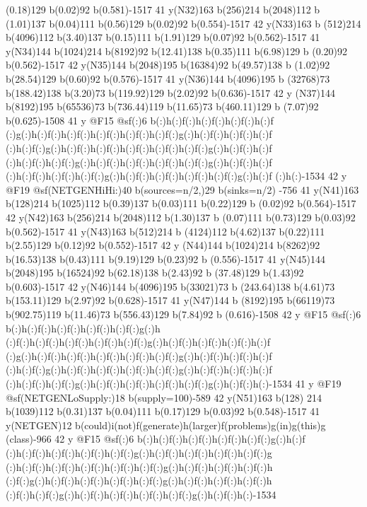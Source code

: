 {{{{{{{{{{{{{{{{{{{{{{{{{{{{{{{{{(0.18)129 b(0.02)92 b(0.581)-1517 41 y(N32)163 b(256)214 b(2048)112 b
(1.01)137 b(0.04)111 b(0.56)129 b(0.02)92 b(0.554)-1517 42 y(N33)163 b
(512)214 b(4096)112 b(3.40)137 b(0.15)111 b(1.91)129 b(0.07)92 b(0.562)-1517 
41 y(N34)144 b(1024)214 b(8192)92 b(12.41)138 b(0.35)111 b(6.98)129 b
(0.20)92 b(0.562)-1517 42 y(N35)144 b(2048)195 b(16384)92 b(49.57)138 b
(1.02)92 b(28.54)129 b(0.60)92 b(0.576)-1517 41 y(N36)144 b(4096)195 b
(32768)73 b(188.42)138 b(3.20)73 b(119.92)129 b(2.02)92 b(0.636)-1517 42 y
(N37)144 b(8192)195 b(65536)73 b(736.44)119 b(11.65)73 b(460.11)129 b
(7.07)92 b(0.625)-1508 41 y @F15 @sf(:)6 b(:)h(:)f(:)h(:)f(:)h(:)f(:)h(:)f
(:)g(:)h(:)f(:)h(:)f(:)h(:)f(:)h(:)f(:)h(:)f(:)g(:)h(:)f(:)h(:)f(:)h(:)f
(:)h(:)f(:)g(:)h(:)f(:)h(:)f(:)h(:)f(:)h(:)f(:)h(:)f(:)g(:)h(:)f(:)h(:)f
(:)h(:)f(:)h(:)f(:)g(:)h(:)f(:)h(:)f(:)h(:)f(:)h(:)f(:)g(:)h(:)f(:)h(:)f
(:)h(:)f(:)h(:)f(:)h(:)f(:)g(:)h(:)f(:)h(:)f(:)h(:)f(:)h(:)f(:)g(:)h(:)f
(:)h(:)-1534 42 y @F19 @sf(NETGEN{Hi{Hi:)40 b(sources=n/2,)29 b(sinks=n/2)
-756 41 y(N41)163 b(128)214 b(1025)112 b(0.39)137 b(0.03)111 b(0.22)129 b
(0.02)92 b(0.564)-1517 42 y(N42)163 b(256)214 b(2048)112 b(1.30)137 b
(0.07)111 b(0.73)129 b(0.03)92 b(0.562)-1517 41 y(N43)163 b(512)214 b
(4124)112 b(4.62)137 b(0.22)111 b(2.55)129 b(0.12)92 b(0.552)-1517 42 y
(N44)144 b(1024)214 b(8262)92 b(16.53)138 b(0.43)111 b(9.19)129 b(0.23)92 b
(0.556)-1517 41 y(N45)144 b(2048)195 b(16524)92 b(62.18)138 b(2.43)92 b
(37.48)129 b(1.43)92 b(0.603)-1517 42 y(N46)144 b(4096)195 b(33021)73 b
(243.64)138 b(4.61)73 b(153.11)129 b(2.97)92 b(0.628)-1517 41 y(N47)144 b
(8192)195 b(66119)73 b(902.75)119 b(11.46)73 b(556.43)129 b(7.84)92 b
(0.616)-1508 42 y @F15 @sf(:)6 b(:)h(:)f(:)h(:)f(:)h(:)f(:)h(:)f(:)g(:)h
(:)f(:)h(:)f(:)h(:)f(:)h(:)f(:)h(:)f(:)g(:)h(:)f(:)h(:)f(:)h(:)f(:)h(:)f
(:)g(:)h(:)f(:)h(:)f(:)h(:)f(:)h(:)f(:)h(:)f(:)g(:)h(:)f(:)h(:)f(:)h(:)f
(:)h(:)f(:)g(:)h(:)f(:)h(:)f(:)h(:)f(:)h(:)f(:)g(:)h(:)f(:)h(:)f(:)h(:)f
(:)h(:)f(:)h(:)f(:)g(:)h(:)f(:)h(:)f(:)h(:)f(:)h(:)f(:)g(:)h(:)f(:)h(:)-1534 
41 y @F19 @sf(NETGEN{Lo{Supply:)18 b(supply=100)-589 42 y(N51)163 b(128)
214 b(1039)112 b(0.31)137 b(0.04)111 b(0.17)129 b(0.03)92 b(0.548)-1517 
41 y(NETGEN)12 b(could)i(not)f(generate)h(larger)f(problems)g(in)g(this)g
(class)-966 42 y @F15 @sf(:)6 b(:)h(:)f(:)h(:)f(:)h(:)f(:)h(:)f(:)g(:)h(:)f
(:)h(:)f(:)h(:)f(:)h(:)f(:)h(:)f(:)g(:)h(:)f(:)h(:)f(:)h(:)f(:)h(:)f(:)g
(:)h(:)f(:)h(:)f(:)h(:)f(:)h(:)f(:)h(:)f(:)g(:)h(:)f(:)h(:)f(:)h(:)f(:)h
(:)f(:)g(:)h(:)f(:)h(:)f(:)h(:)f(:)h(:)f(:)g(:)h(:)f(:)h(:)f(:)h(:)f(:)h
(:)f(:)h(:)f(:)g(:)h(:)f(:)h(:)f(:)h(:)f(:)h(:)f(:)g(:)h(:)f(:)h(:)-1534 
}}}}}}}}}}}}}}}}}}}}}}}}}}}}}}}}}}}}}

